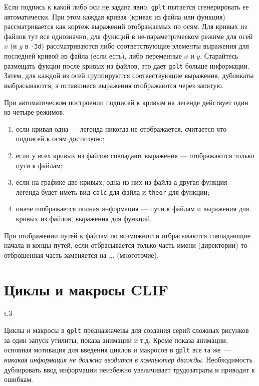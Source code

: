 \documentclass[12pt]{article}
\def\gplt{{\tt gplt}}
\begin{document}
Если подпись к какой либо оси не задана явно, \gplt{} пытается сгенерировать ее автоматически.
При этом каждая кривая (кривая из файла или функция) рассматривается как кортеж выражений отображаемых по осям.
Для кривых из файлов тут все однозначно, для функций в не-параметрическом режиме для осей $x$ (и $y$ в \verb'-3d')
рассматриваются либо соответствующие элементы выражения для последней кривой из файла (если есть), либо 
переменные $x$ и $y$. Старайтесь размещать фукции после кривых из файлов, это дает \gplt{} больше информации.
Затем, для каждой из осей группируются соотвествующие выражения, дубликаты выбрасываются, а оставшиеся выражения отображаются через запятую.

При автоматическом построении подписей к кривым на легенде действует один из четыре режимов:
\begin{enumerate}
\item если кривая одна --- легенда никогда не отображается, считается что подписей к осям достаточно;
\item если у всех кривых из файлов совпадают выражения --- отображаются только пути к файлам;
\item если на графике две кривых, одна из них из файла а другая функция --- легенда будет иметь вид \verb'calc' для файла и \verb'theor' для функции;
\item иначе отображается полная информация --- пути к файлам и выражения для кривых из файлов, выражения для функций.
\end{enumerate}
При отображении путей к файлам по возможности отбрасываются совпадающие начала и концы путей, если отбрасывается только часть имени (директории)
то отброшенная часть заменяется на ...
(многоточие).
\pagebreak

\section{Циклы и макросы CLIF}\label{clif:sec}
\begin{wrapfigure}[7]{t}{.3\textwidth}
  \vphantom{.}
  \vspace{-3cm}

\end{wrapfigure}
Циклы и макросы в \gplt{} предназначены для создания серий сложных рисунков за один запуск утилиты, показа анимации и т.д.
Кроме показа анимации, основная мотивация для введения циклов и макросов в \gplt{} все та же~--- {\it никакая информация не должна вводится в компьютер дважды}.
Необходимость дублировать ввод информации неизбежно увеличивает трудозатраты и приводит к ошибкам.
\end{document}
